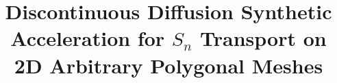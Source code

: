 \documentclass{article}
\renewcommand{\(}{\left(}
\renewcommand{\)}{\right)}
\renewcommand{\[}{\left[}
\renewcommand{\]}{\right]}
\newcommand{\sn}{\ensuremath{S_n}\xspace}
\begin{document}
\title{Discontinuous Diffusion Synthetic Acceleration for \sn Transport on
2D Arbitrary Polygonal Meshes}
\author{} 
\date{}
\maketitle








%



\end{document}
